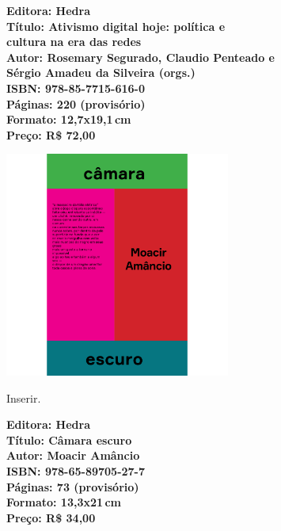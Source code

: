 \vfill
\noindent\begin{minipage}[c]{1\linewidth}
{\small\textbf{
\hspace*{-.1cm}Editora: Hedra\\
Título: Ativismo digital hoje: política e\\cultura na era das redes\\
Autor: Rosemary Segurado, Claudio Penteado e\\Sérgio Amadeu da Silveira (orgs.)\\ 
ISBN: 978-85-7715-616-0\\
Páginas: 220 (provisório)\\
Formato: 12,7x19,1\,cm\\
Preço: R\$ 72,00\\
}}
\end{minipage}
\pagebreak

\begin{center}
\hspace*{-3.6cm}
\hspace*{3.1cm}\includegraphics[width=74mm]{./CAPAS/HEDRA_CAMARA.jpg}
\end{center}
\hspace*{-7cm}\hrulefill\hspace*{-7cm}
\medskip

\noindent{}Inserir.

\vfill
\noindent\begin{minipage}[c]{1\linewidth}
{\small\textbf{
\hspace*{-.1cm}Editora: Hedra\\
Título: Câmara escuro\\
Autor: Moacir Amâncio\\ 
ISBN: 978-65-89705-27-7\\
Páginas: 73 (provisório)\\
Formato: 13,3x21\,cm\\
Preço: R\$ 34,00\\
}}
\end{minipage}
\pagebreak


